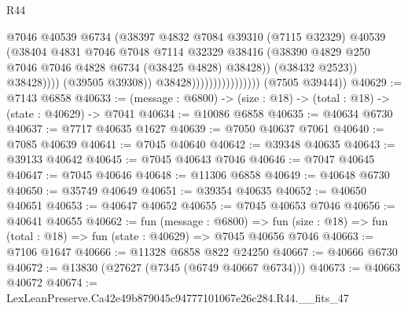 \begin{lexlean}{R44}
\begin{coremodule}
{                                                @7046
                                                @40539
                                                @6734
                                                (@38397
                                                  @4832
                                                  @7084
                                                  @39310
                                                  (@7115 @32329)
                                                  @40539
                                                  (@38404
                                                    @4831
                                                    @7046
                                                    @7048
                                                    @7114
                                                    @32329
                                                    @38416
                                                    (@38390
                                                      @4829
                                                      @250
                                                      @7046
                                                      @7046
                                                      @4828
                                                      @6734
                                                      (@38425 @4828)
                                                      @38428))
                                                  (@38432 @2523))
                                                @38428))))
                                        (@39505 @39308))
                                      @38428))))))))))))))))
      (@7505 @39444))
@40629 := @7143 @6858
@40633 := (message : @6800) -> (size : @18) -> (total : @18) -> (state : @40629) -> @7041
@40634 := @10086 @6858
@40635 := @40634 @6730
@40637 := @7717 @40635 @1627
@40639 := @7050 @40637 @7061
@40640 := @7085 @40639
@40641 := @7045 @40640
@40642 := @39348 @40635
@40643 := @39133 @40642
@40645 := @7045 @40643 @7046
@40646 := @7047 @40645
@40647 := @7045 @40646
@40648 := @11306 @6858
@40649 := @40648 @6730
@40650 := @35749 @40649
@40651 := @39354 @40635
@40652 := @40650 @40651
@40653 := @40647 @40652
@40655 := @7045 @40653 @7046
@40656 := @40641 @40655
@40662 := fun (message : @6800) =>
  fun (size : @18) => fun (total : @18) => fun (state : @40629) => @7045 @40656 @7046
@40663 := @7106 @1647
@40666 := @11328 @6858 @822 @24250
@40667 := @40666 @6730
@40672 := @13830 (@27627 (@7345 (@6749 @40667 @6734)))
@40673 := @40663 @40672
@40674 := LexLeanPreserve.Ca42e49b879045c94777101067e26c284.R44.__fits_47
}
\end{coremodule}
\end{lexlean}
